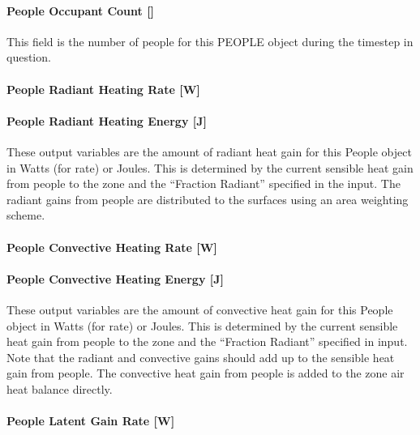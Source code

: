 \paragraph{People Occupant Count {[]}}\label{people-occupant-count}

This field is the number of people for this PEOPLE object during the timestep in question.

\paragraph{People Radiant Heating Rate {[}W{]}}\label{people-radiant-heating-rate-w}

\paragraph{People Radiant Heating Energy {[}J{]}}\label{people-radiant-heating-energy-j}

These output variables are the amount of radiant heat gain for this People object in Watts (for rate) or Joules. This is determined by the current sensible heat gain from people to the zone and the ``Fraction Radiant'' specified in the input. The radiant gains from people are distributed to the surfaces using an area weighting scheme.

\paragraph{People Convective Heating Rate {[}W{]}}\label{people-convective-heating-rate-w}

\paragraph{People Convective Heating Energy {[}J{]}}\label{people-convective-heating-energy-j}

These output variables are the amount of convective heat gain for this People object in Watts (for rate) or Joules. This is determined by the current sensible heat gain from people to the zone and the ``Fraction Radiant'' specified in input. Note that the radiant and convective gains should add up to the sensible heat gain from people. The convective heat gain from people is added to the zone air heat balance directly.

\paragraph{People Latent Gain Rate {[}W{]}}\label{people-latent-gain-rate-w}

